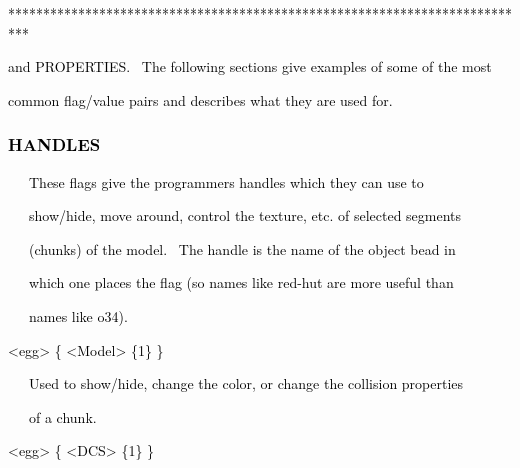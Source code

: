 \documentclass[a4paper]{article}
\newcommand\textstyleOOoComputerKeyWord[1]{\textrm{\textcolor[rgb]{0.0,0.0,0.5019608}{#1}}}
\begin{document}
{\color{black}
\textstyleOOoComputerKeyWord{\textcolor{black}{***************************************************************************}}}

\clearpage{\color{black}
\textstyleOOoComputerKeyWord{\textcolor{black}{The player uses several different types of model flags: HANDLES,
BEHAVIORS,}}}

{\color{black}
\textstyleOOoComputerKeyWord{\textcolor{black}{and PROPERTIES. \ The following sections give examples of some of the
most}}}

{\color{black}
\textstyleOOoComputerKeyWord{\textcolor{black}{common flag/value pairs and describes what they are used for.}}}

\subsubsection[HANDLES ]{\textstyleOOoComputerKeyWord{\textcolor{black}{HANDLES }}}
\hypertarget{RefHeading7914869075401}{}
\bigskip

{\color{black}
\textstyleOOoComputerKeyWord{\textcolor{black}{\ \ \ These flags give the programmers handles which they can use to}}}

{\color{black}
\textstyleOOoComputerKeyWord{\textcolor{black}{\ \ \ show/hide, move around, control the texture, etc. of selected
segments}}}

{\color{black}
\textstyleOOoComputerKeyWord{\textcolor{black}{\ \ \ (chunks) of the model. \ The handle is the name of the object bead
in}}}

{\color{black}
\textstyleOOoComputerKeyWord{\textcolor{black}{\ \ \ which one places the flag (so names like red-hut are more useful
than}}}

{\color{black}
\textstyleOOoComputerKeyWord{\textcolor{black}{\ \ \ names like o34).}}}


\bigskip

{\color{black}
\textstyleOOoComputerKeyWord{\textcolor{black}{{\textless}egg{\textgreater} \{ {\textless}Model{\textgreater} \{1\} \}
\ \ }}}


\bigskip

{\color{black}
\textstyleOOoComputerKeyWord{\textcolor{black}{\ \ \ Used to show/hide, change the color, or change the collision
properties }}}

{\color{black}
\textstyleOOoComputerKeyWord{\textcolor{black}{\ \ \ of a chunk.}}}


\bigskip

{\color{black}
\textstyleOOoComputerKeyWord{\textcolor{black}{{\textless}egg{\textgreater} \{ {\textless}DCS{\textgreater} \{1\} \}
\ \ \ \ }}}
\end{document}
